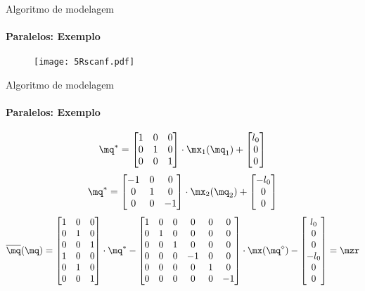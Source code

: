 \documentclass[25pt,landscape]{beamer}
\begin{document}
\begin{frame}{Algoritmo de modelagem}
    \framesubtitle{Paralelos: Exemplo}
    \pause
    \begin{figure}[!h]
        \centering
        \texttt{[image: 5Rscanf.pdf]}
    \end{figure}
\end{frame}

\begin{frame}{Algoritmo de modelagem}
    \framesubtitle{Paralelos: Exemplo}
	$$ \mq^* = 
\begin{bmatrix}
1 & 0 & 0 \\
0 & 1 & 0 \\
0 & 0 & 1 \\
\end{bmatrix}
\cdot
\mx_1(\mq_1)
+
\begin{bmatrix}
l_0 \\
0 \\
0 \\
\end{bmatrix} $$
$$ \mq^* = 
\begin{bmatrix}
-1 & 0 & 0 \\
0 & 1 & 0 \\
0 & 0 & -1 \\
\end{bmatrix}
\cdot
\mx_2(\mq_2)
+
\begin{bmatrix}
-l_0 \\
0 \\
0 \\
\end{bmatrix} $$
\pause
$$ \overline{\mq}(\mq) =
\begin{bmatrix}
1 & 0 & 0\\
0 & 1 & 0\\
0 & 0 & 1\\
1 & 0 & 0\\
0 & 1 & 0\\
0 & 0 & 1\\
\end{bmatrix}
\cdot
\mq^*
-
\begin{bmatrix}
1 & 0 & 0 & 0 & 0 & 0 \\
0 & 1 & 0 & 0 & 0 & 0 \\
0 & 0 & 1 & 0 & 0 & 0 \\
0 & 0 & 0 & -1 & 0 & 0 \\
0 & 0 & 0 & 0 & 1 & 0 \\
0 & 0 & 0 & 0 & 0 & -1 \\
\end{bmatrix}
\cdot
\mx(\mq^\diamond)
-
\begin{bmatrix}
l_0 \\
0 \\
0 \\
-l_0 \\
0 \\
0 \\
\end{bmatrix}
= \mzr $$
\end{frame}
\end{document}
